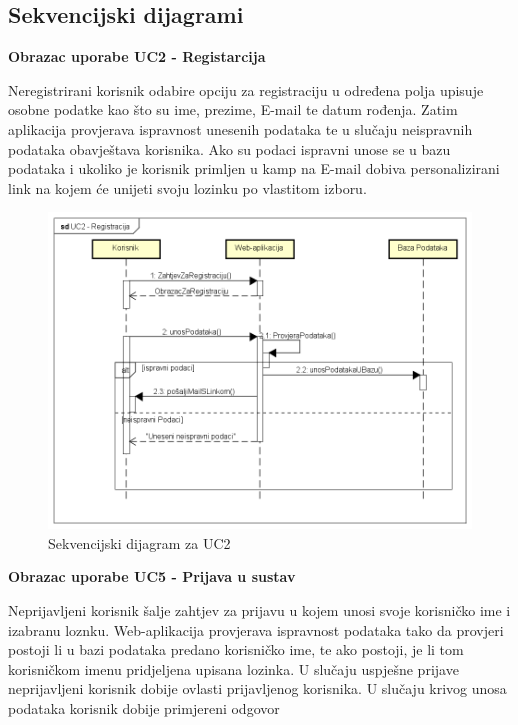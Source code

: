 \pagebreak

\subsection{Sekvencijski dijagrami}

\textbf{Obrazac uporabe UC2 - Registarcija}

Neregistrirani korisnik odabire opciju za registraciju u određena polja
upisuje osobne podatke kao što su ime, prezime, E-mail te datum rođenja.
Zatim aplikacija provjerava ispravnost unesenih podataka te u slučaju
neispravnih podataka obavještava korisnika. Ako su podaci ispravni unose
se u bazu podataka i ukoliko je korisnik primljen u kamp na E-mail dobiva
personalizirani link na kojem će unijeti svoju lozinku po vlastitom izboru.


\begin{figure}[H]
	\includegraphics[scale=0.5]{dijagrami/UC2 - Registracija.png} %
	\centering
	\caption{Sekvencijski dijagram za UC2}
	\label{fig:promjene}
\end{figure}

\pagebreak

\textbf{Obrazac uporabe UC5 - Prijava u sustav}

Neprijavljeni korisnik šalje zahtjev za prijavu u kojem unosi
svoje korisničko ime i izabranu loznku. Web-aplikacija provjerava
ispravnost podataka tako da provjeri postoji li u bazi podataka
predano korisničko ime, te ako postoji, je li tom korisničkom imenu pridjeljena upisana lozinka. U slučaju uspješne prijave
neprijavljeni korisnik dobije ovlasti prijavljenog korisnika. U slučaju krivog unosa podataka korisnik dobije primjereni odgovor

